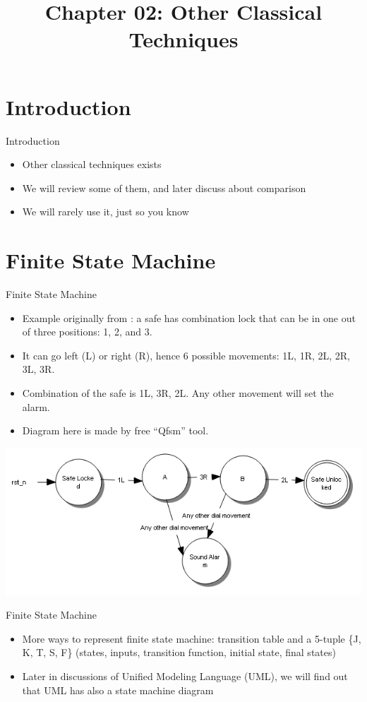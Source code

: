 \documentclass{beamer}
\title{Chapter 02: Other Classical Techniques}
\begin{document}
	\begin{frame}
		\titlepage
	\end{frame}

	\section{Introduction}
	\begin{frame}{Introduction}
		\begin{itemize}
		    \item Other classical techniques exists
		    \item We will review some of them, and later discuss about comparison
		    \item We will rarely use it, just so you know
		\end{itemize}
	\end{frame}
	
	\section{Finite State Machine}
	\begin{frame}{Finite State Machine}
    	\begin{itemize}
    	    \item Example originally from \cite{brady1977theory}: a safe has combination lock that can be in one out of three positions: 1, 2, and 3.
    	    \item It can go left (L) or right (R), hence 6 possible movements: 1L, 1R, 2L, 2R, 3L, 3R.
    	    \item Combination of the safe is 1L, 3R, 2L. Any other movement will set the alarm.
    	    \item Diagram here is made by free ``Qfsm'' tool.
	    \end{itemize}
	    \includegraphics[scale=0.5]{img/03_safe_fsm.png}
	\end{frame}
	\begin{frame}{Finite State Machine}
    	\begin{itemize}
    	    \item More ways to represent finite state machine: transition table and a 5-tuple \{J, K, T, S, F\} (states, inputs, transition function, initial state, final states)
    	    \item Later in discussions of Unified Modeling Language (UML), we will find out that UML has also a state machine diagram
	    \end{itemize}
	\end{frame}
\end{document}
